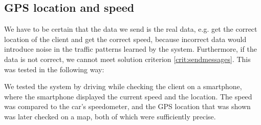

\subsection{GPS location and speed}
We have to be certain that the data we send is the real data, e.g. get the correct location of the client and get the correct speed, because incorrect data would introduce noise in the traffic patterns learned by the system. Furthermore, if the data is not correct, we cannot meet solution criterion \ref{crit:sendmessages}. This was tested in the following way:

We tested the system by driving while checking the client on a smartphone, where the smartphone displayed the current speed and the location. The speed was compared to the car's speedometer, and the GPS location that was shown was later checked on a map, both of which were sufficiently precise.